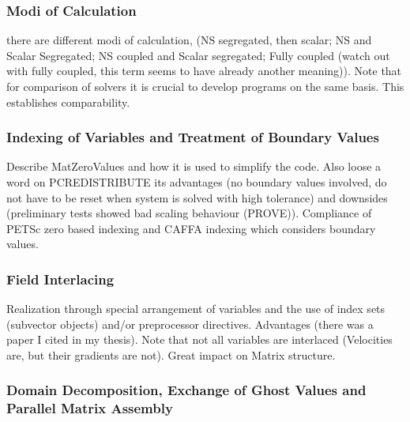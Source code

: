         \subsubsection{Modi of Calculation}
          there are different modi of calculation, (NS segregated, then scalar; NS and Scalar Segregated; NS coupled and Scalar segregated; Fully coupled (watch out with fully coupled, this term seems to have already another meaning)). Note that for comparison of solvers it is crucial to develop programs on the same basis. This establishes comparability.

      \subsubsection{Indexing of Variables and Treatment of Boundary Values}
      Describe MatZeroValues and how it is used to simplify the code. Also loose a word on PCREDISTRIBUTE its advantages (no boundary values involved, do not have to be reset when system is solved with high tolerance) and downsides (preliminary tests showed bad scaling behaviour (PROVE)). Compliance of PETSc zero based indexing and CAFFA indexing which considers boundary values.
      \subsubsection{Field Interlacing}
      Realization through special arrangement of variables and the use of index sets (subvector objects) and/or preprocessor directives. Advantages (there was a paper I cited in my thesis). Note that not all variables are interlaced (Velocities are, but their gradients are not). Great impact on Matrix structure.
      \subsubsection{Domain Decomposition, Exchange of Ghost Values and Parallel Matrix Assembly}

